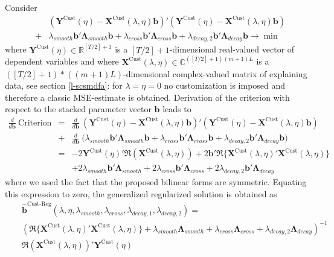 \documentclass[a4paper]{book}
\begin{document}
Consider
\begin{eqnarray}\label{regcustreg}
&&(\mathbf{Y}^{\textrm{Cust}}(\eta)-\mathbf{X}^{\textrm{Cust}}(\lambda,\eta)\mathbf{b})'(\mathbf{Y}^{\textrm{Cust}}(\eta)-\mathbf{X}^{\textrm{Cust}}(\lambda,\eta)\mathbf{b})\nonumber\\
&+&\lambda_{{smooth}}\mathbf{b}'\boldsymbol{\Lambda}_{smooth}\mathbf{b}
+\lambda_{{cross}}\mathbf{b}'\boldsymbol{\Lambda}_{cross}\mathbf{b}+\lambda_{{decay,2}}\mathbf{b}'\boldsymbol{\Lambda}_{decay}\mathbf{b}\to\min
\end{eqnarray}
where $\mathbf{Y}^{\textrm{Cust}}(\eta)\in \mathbb{R}^{[T/2]+1}$ is a $[T/2]+1$-dimensional real-valued vector of dependent variables and where $\mathbf{X}^{\textrm{Cust}}(\lambda,\eta)\in \mathbb{C}^{([T/2]+1)(m+1)L}$ is a $([T/2]+1)*((m+1)L)$-dimensional complex-valued matrix of explaining data, see section \ref{l-scsmdfa}: for $\lambda=\eta=0$ no customization is imposed and therefore a classic MSE-estimate is obtained. Derivation of the criterion with respect to the stacked parameter vector $\mathbf{b}$ leads to
\begin{eqnarray*}
\frac{d}{d\mathbf{b}}~\textrm{Criterion}&=&\frac{d}{d\mathbf{b}}~(\mathbf{Y}^{\textrm{Cust}}(\eta)-\mathbf{X}^{\textrm{Cust}}(\lambda,\eta)\mathbf{b})'(\mathbf{Y}^{\textrm{Cust}}(\eta)-\mathbf{X}^{\textrm{Cust}}(\lambda,\eta)\mathbf{b})\nonumber\\
&+&\frac{d}{d\mathbf{b}}~\Big(\lambda_{{smooth}}\mathbf{b}'\boldsymbol{\Lambda}_{smooth}\mathbf{b}
+\lambda_{{cross}}\mathbf{b}'\boldsymbol{\Lambda}_{cross}\mathbf{b}+\lambda_{{decay,2}}\mathbf{b}'\boldsymbol{\Lambda}_{decay}\mathbf{b}\Big)\\
&=&-2\mathbf{Y}^{\textrm{Cust}}(\eta)'\Re\left(\mathbf{X}^{\textrm{Cust}}(\lambda,\eta)\right)+2\mathbf{b}'\Re\bigg\{\mathbf{X}^{\textrm{Cust}}(\lambda,\eta)'\mathbf{X}^{\textrm{Cust}}(\lambda,\eta)\bigg\}\\
&&+2\lambda_{{smooth}}\mathbf{b}'\boldsymbol{\Lambda}_{smooth}
+2\lambda_{{cross}}\mathbf{b}'\boldsymbol{\Lambda}_{cross}+2\lambda_{{decay},2}\mathbf{b}'\boldsymbol{\Lambda}_{decay}
\end{eqnarray*}
where we used the fact that the proposed bilinear forms are symmetric. Equating this expression to zero, the generalized regularized solution is obtained as
\begin{eqnarray}\label{bregcustreg}
&&\mathbf{\hat{b}}^{\textrm{Cust-Reg}}(\lambda,\eta,\lambda_{{smooth}},\lambda_{{cross}},\lambda_{{decay,1}},\lambda_{decay,2})=\\
&&\left(\Re\bigg\{\mathbf{X}^{\textrm{Cust}}(\lambda,\eta)' \mathbf{X}^{\textrm{Cust}}(\lambda,\eta)\bigg\}+
\lambda_{{smooth}}\boldsymbol{\Lambda}_{smooth}+\lambda_{{cross}}\boldsymbol{\Lambda}_{cross}+\lambda_{{decay},2}\boldsymbol{\Lambda}_{decay}
\right)^{-1}\nonumber\\
&&\Re(\mathbf{X}^{\textrm{Cust}}(\lambda,\eta))'
\mathbf{Y}^{\textrm{Cust}}(\eta)\nonumber
\end{eqnarray}
\end{document}

